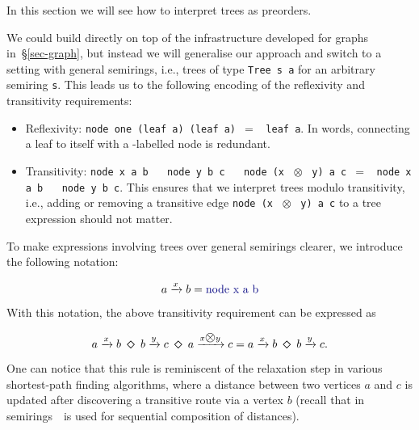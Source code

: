 \documentclass[english,submission]{programming}
\newcommand{\hcode}[1]{{\color{darkblue} \lstinline[keywordstyle={}]|#1|}} %
\newcommand{\hmul}{{\large\color{darkblue} $\otimes$}}
\newcommand{\hdia}{\,\text{\raisebox{-0.2mm}{\Large\color{darkblue} $\diamond$}}\,}
\newcommand{\mul}{\text{\raisebox{-0.1mm}{\large $\otimes$}}}
\newcommand{\one}{\raisebox{-0.2mm}{\textcircled{1}}\xspace}
\newcommand{\dia}{\,\text{\raisebox{-0.3mm}{\Large $\diamond$}}\,}
\begin{document}
\noindent
In this section we will see how to interpret trees as preorders.

\newpage
\noindent
We could build directly on top of the infrastructure developed for graphs
in~\S\ref{sec-graph}, but instead we will generalise our approach and switch to
a setting with general semirings, i.e., trees of type \hcode{Tree s a} for an
arbitrary semiring \hcode{s}. This leads us to the following encoding of the
reflexivity and transitivity requirements:

\begin{itemize}
    \item Reflexivity: \hcode{node one (leaf a) (leaf a)}~$=$~\hcode{leaf a}. In
    words, connecting a leaf to itself with a \one-labelled node is redundant.
    \item Transitivity:
    \hcode{node x a b}~\hdia~\hcode{node y b c}~\hdia~\hcode{node (x}~\hmul~\hcode{y) a c}~$=$~\hcode{node x a b}~\hdia~\hcode{node y b c}.
    This ensures that we interpret trees modulo transitivity, i.e., adding or
    removing a transitive edge \hcode{node (x}~\hmul~\hcode{y) a c} to a tree
    expression should not matter.
\end{itemize}

\noindent
To make expressions involving trees over general semirings clearer, we introduce
the following notation:

\vspace{-5mm}
\begin{equation*}
a \xrightarrow{x} b = \text{\hcode{node x a b}}
\end{equation*}
\vspace{-5mm}

\noindent
With this notation, the above transitivity requirement can be expressed as

\vspace{-5mm}
\begin{equation*}
a \xrightarrow{x} b\ \dia\ b \xrightarrow{y} c\ \dia\ a \xrightarrow{x \mul y} c = a \xrightarrow{x} b\ \dia\ b \xrightarrow{y} c.
\end{equation*}
\vspace{-5mm}

\noindent
One can notice that this rule is reminiscent of the relaxation step in various
shortest-path finding algorithms, where a distance between two vertices $a$ and
$c$ is updated after discovering a transitive route via a vertex $b$ (recall
that in semirings~\mul~is used for sequential composition of distances).
\end{document}

